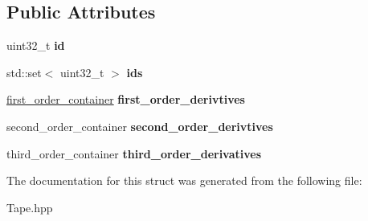 \subsection*{Public Attributes}
\begin{DoxyCompactItemize}
\item 
\hypertarget{structatl_1_1_forward_mode_derivative_info_a8e630778e7d6b813ae08c8f15bbcbbab}{uint32\+\_\+t {\bfseries id}}\label{structatl_1_1_forward_mode_derivative_info_a8e630778e7d6b813ae08c8f15bbcbbab}

\item 
\hypertarget{structatl_1_1_forward_mode_derivative_info_a761da8965e352a5594e433d7f635ed63}{std\+::set$<$ uint32\+\_\+t $>$ {\bfseries ids}}\label{structatl_1_1_forward_mode_derivative_info_a761da8965e352a5594e433d7f635ed63}

\item 
\hypertarget{structatl_1_1_forward_mode_derivative_info_a2477b93d5b22bc0be1eacdd04b47d5e8}{\hyperlink{classemlib_1_1_hash_map}{first\+\_\+order\+\_\+container} {\bfseries first\+\_\+order\+\_\+derivtives}}\label{structatl_1_1_forward_mode_derivative_info_a2477b93d5b22bc0be1eacdd04b47d5e8}

\item 
\hypertarget{structatl_1_1_forward_mode_derivative_info_afb91f16ab0dde6fed76743f2fef3a811}{second\+\_\+order\+\_\+container {\bfseries second\+\_\+order\+\_\+derivtives}}\label{structatl_1_1_forward_mode_derivative_info_afb91f16ab0dde6fed76743f2fef3a811}

\item 
\hypertarget{structatl_1_1_forward_mode_derivative_info_a3844d5c6f80fd8a3d84aa478620ce223}{third\+\_\+order\+\_\+container {\bfseries third\+\_\+order\+\_\+derivatives}}\label{structatl_1_1_forward_mode_derivative_info_a3844d5c6f80fd8a3d84aa478620ce223}

\end{DoxyCompactItemize}


The documentation for this struct was generated from the following file\+:\begin{DoxyCompactItemize}
\item 
Tape.\+hpp\end{DoxyCompactItemize}
